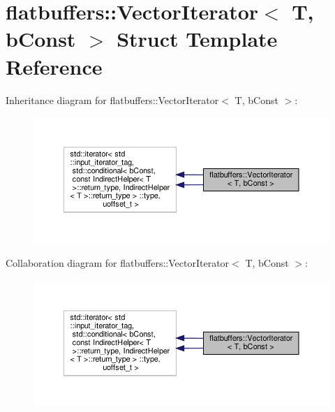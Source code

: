 \hypertarget{structflatbuffers_1_1VectorIterator}{}\section{flatbuffers\+:\+:Vector\+Iterator$<$ T, b\+Const $>$ Struct Template Reference}
\label{structflatbuffers_1_1VectorIterator}


Inheritance diagram for flatbuffers\+:\+:Vector\+Iterator$<$ T, b\+Const $>$\+:
\nopagebreak
\begin{figure}[H]
\begin{center}
\leavevmode
\includegraphics[width=350pt]{structflatbuffers_1_1VectorIterator__inherit__graph}
\end{center}
\end{figure}


Collaboration diagram for flatbuffers\+:\+:Vector\+Iterator$<$ T, b\+Const $>$\+:
\nopagebreak
\begin{figure}[H]
\begin{center}
\leavevmode
\includegraphics[width=350pt]{structflatbuffers_1_1VectorIterator__coll__graph}
\end{center}
\end{figure}
